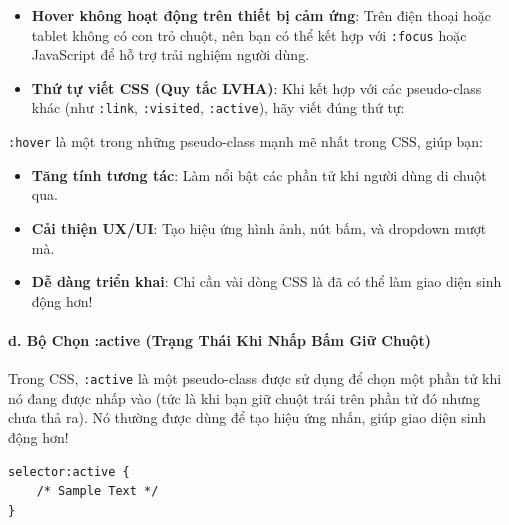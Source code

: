 \documentclass[11pt,oneside]{book}
\newcommand{\codeinline}[1]{\textcolor{accentOrange}{\texttt{#1}}}
\begin{document}
\begin{warnBox}
\begin{itemize}[leftmargin=1.5em, itemsep=3pt, parsep=0pt]
    \item \textbf{Hover không hoạt động trên thiết bị cảm ứng}: Trên điện thoại hoặc tablet không có con trỏ chuột, nên bạn có thể kết hợp với \codeinline{:focus} hoặc JavaScript để hỗ trợ trải nghiệm người dùng.
    \item \textbf{Thứ tự viết CSS (Quy tắc LVHA)}: Khi kết hợp với các pseudo-class khác (như \codeinline{:link}, \codeinline{:visited}, \codeinline{:active}), hãy viết đúng thứ tự:
    \par\vspace{3pt}
\end{itemize}
\end{warnBox}

\begin{conceptBox}
\codeinline{:hover} là một trong những pseudo-class mạnh mẽ nhất trong CSS, giúp bạn:
\begin{itemize}[leftmargin=1.5em, itemsep=2pt, parsep=0pt]
    \item \textbf{Tăng tính tương tác}: Làm nổi bật các phần tử khi người dùng di chuột qua.
    \item \textbf{Cải thiện UX/UI}: Tạo hiệu ứng hình ảnh, nút bấm, và dropdown mượt mà.
    \item \textbf{Dễ dàng triển khai}: Chỉ cần vài dòng CSS là đã có thể làm giao diện sinh động hơn!
\end{itemize}
\end{conceptBox}

\paragraph{d. Bộ Chọn :active (Trạng Thái Khi Nhấp Bấm Giữ Chuột)}

Trong CSS, \codeinline{:active} là một pseudo-class được sử dụng để chọn một phần tử khi nó đang được nhấp vào (tức là khi bạn giữ chuột trái trên phần tử đó nhưng chưa thả ra). Nó thường được dùng để tạo hiệu ứng nhấn, giúp giao diện sinh động hơn!

\begin{conceptBox}
\begin{codeWindow}
\begin{lstlisting}[language=CSS3]
selector:active {
    /* Sample Text */
}
\end{lstlisting}
\end{codeWindow}
\end{conceptBox}
\end{document}
